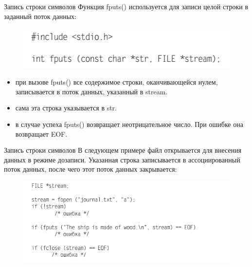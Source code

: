 \documentclass{beamer}
\begin{document}
\begin{frame}{Запись строки символов}
Функция fputs() используется для записи целой строки в заданный поток данных:
\begin{figure}[h]
\centering
\includegraphics[scale=0.75]{images/lec05-pic19.png}
\end{figure}
\begin{itemize}
\item при вызове fputs() все содержимое строки, оканчивающейся нулем, записывается в поток данных, указанный в stream.
\item сама эта строка указывается в str. 
\item в случае успеха fputs() возвращает неотрицательное число. При ошибке она возвращает EOF.
\end{itemize}
\end{frame}

\begin{frame}{Запись строки символов}
В следующем примере файл открывается для внесения данных в режиме дозаписи. Указанная строка записывается в ассоциированный поток данных, после чего
этот поток данных закрывается:
\begin{figure}[h]
\centering
\includegraphics[scale=0.75]{images/lec05-pic20.png}
\end{figure}
\end{frame}
\end{document}
